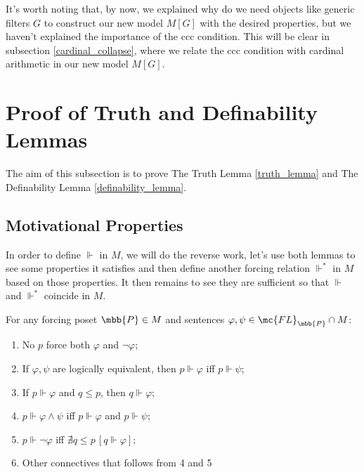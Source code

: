 It's worth noting that, by now, we explained why do we need objects like generic filters $G$ to construct our new model $M[G]$ with the desired properties, but we haven't explained the importance of the ccc condition. This will be clear in subsection \ref{cardinal_collapse}, where we relate the ccc condition with cardinal arithmetic in our new model $M[G]$.

\section{Proof of Truth and Definability Lemmas}

The aim of this subsection is to prove The Truth Lemma \ref{truth_lemma} and The Definability Lemma \ref{definability_lemma}.

\subsection{Motivational Properties}

In order to define $\Vdash$ in $M$, we will do the reverse work, let's use both lemmas to see some properties it satisfies and then define another forcing relation $\Vdash^*$ in $M$ based on those properties. It then remains to see they are sufficient so that $\Vdash$ and $\Vdash^*$ coincide in $M$.

\begin{lemma}{}{}\label{forcing_logical_properties}
    For any forcing poset $\mbb{P}\in M$ and sentences $\varphi,\psi\in\mc{FL}_{\mbb{P}}\cap M$:
    \begin{enumerate}
        \item No $p$ force both $\varphi$ and $\neg\varphi$;
        \item If $\varphi,\psi$ are logically equivalent, then $p\Vdash\varphi$ iff $p\Vdash\psi$;
        \item If $p\Vdash\varphi$ and $q\leq p$, then $q\Vdash\varphi$;
        \item $p\Vdash\varphi\wedge\psi$ iff $p\Vdash\varphi$ and $p\Vdash\psi$;
        \item $p\Vdash\neg\varphi$ iff $\nexists q\leq p\,[q\Vdash\varphi]$;
        \item \textcolor{laser_eyes}{Other connectives that follows from 4 and 5}
    \end{enumerate}
\end{lemma}

